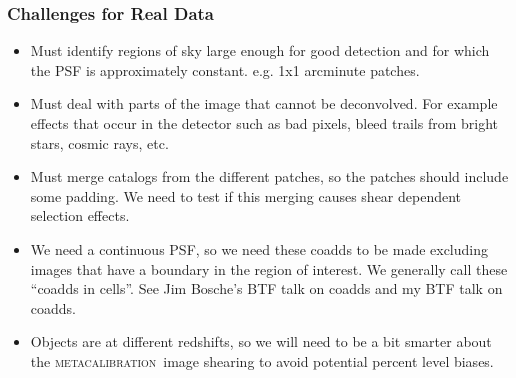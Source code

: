 \documentclass{beamer}
\newcommand{\mcal}{\textsc{metacalibration}}
\begin{document}
\frame
{
    \frametitle{Challenges for Real Data}

 
    \begin{itemize}


        \item Must identify regions of sky large enough for
            good detection and for which the PSF is approximately constant.
            e.g. 1x1 arcminute patches.

        \item Must deal with parts of the image that cannot be deconvolved. For
            example effects that occur in the detector such as bad pixels, bleed trails
            from bright stars, cosmic rays, etc.

        \item Must merge catalogs from the different patches, so
            the patches should include some padding.  We need to test if this
            merging causes shear dependent selection effects.

        \item We need a continuous PSF, so we need these coadds to be made
            excluding images that have a boundary in the region of interest.
            We generally call these ``coadds in cells''.
            See Jim Bosche's BTF talk on coadds and my BTF talk on coadds.

        \item Objects are at different redshifts, so we will need to be a bit
            smarter about the \mcal\ image shearing to avoid potential
            percent level biases.

    \end{itemize}

}
\end{document}
